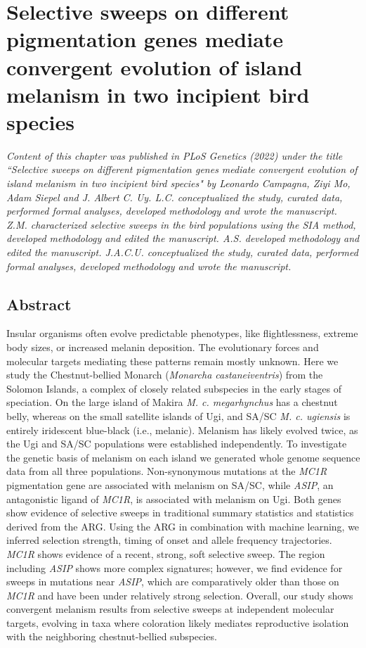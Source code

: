 \chapter{Selective sweeps on different pigmentation genes mediate convergent evolution of island melanism in two incipient bird species}

\textit{Content of this chapter was published in PLoS Genetics (2022) under the title ``Selective sweeps on different pigmentation genes mediate convergent evolution of island melanism in two incipient bird species" by Leonardo Campagna, Ziyi Mo, Adam Siepel and J. Albert C. Uy. L.C. conceptualized the study, curated data, performed formal analyses, developed methodology and wrote the manuscript. Z.M. characterized selective sweeps in the bird populations using the SIA method, developed methodology and edited the manuscript. A.S. developed methodology and edited the manuscript. J.A.C.U. conceptualized the study, curated data, performed formal analyses, developed methodology and wrote the manuscript.}

\section{Abstract}

Insular organisms often evolve predictable phenotypes, like flightlessness, extreme body sizes, or increased melanin deposition. The evolutionary forces and molecular targets mediating these patterns remain mostly unknown. Here we study the Chestnut-bellied Monarch (\textit{Monarcha castaneiventris}) from the Solomon Islands, a complex of closely related subspecies in the early stages of speciation. On the large island of Makira \textit{M. c. megarhynchus} has a chestnut belly, whereas on the small satellite islands of Ugi, and \ac{SA/SC} \textit{M. c. ugiensis} is entirely iridescent blue-black (i.e., melanic). Melanism has likely evolved twice, as the Ugi and \ac{SA/SC} populations were established independently. To investigate the genetic basis of melanism on each island we generated whole genome sequence data from all three populations. Non-synonymous mutations at the \textit{MC1R} pigmentation gene are associated with melanism on \ac{SA/SC}, while \textit{ASIP}, an antagonistic ligand of \textit{MC1R}, is associated with melanism on Ugi. Both genes show evidence of selective sweeps in traditional summary statistics and statistics derived from the \acf{ARG}. Using the \ac{ARG} in combination with machine learning, we inferred selection strength, timing of onset and allele frequency trajectories. \textit{MC1R} shows evidence of a recent, strong, soft selective sweep. The region including \textit{ASIP} shows more complex signatures; however, we find evidence for sweeps in mutations near \textit{ASIP}, which are comparatively older than those on \textit{MC1R} and have been under relatively strong selection. Overall, our study shows convergent melanism results from selective sweeps at independent molecular targets, evolving in taxa where coloration likely mediates reproductive isolation with the neighboring chestnut-bellied subspecies.

